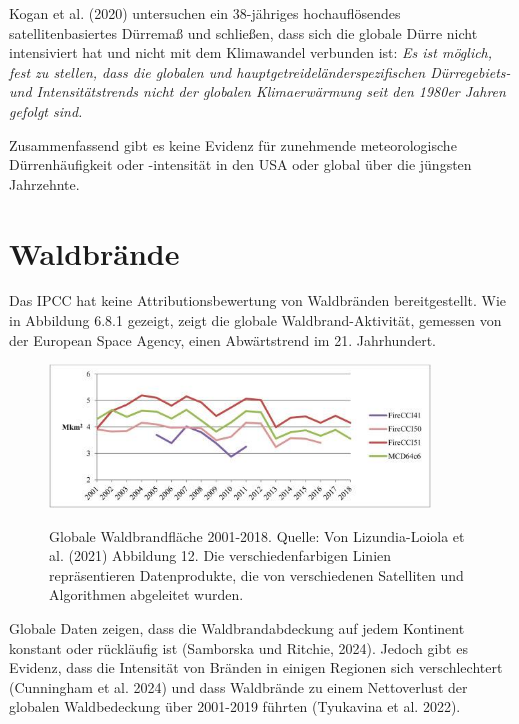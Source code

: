 \documentclass[12pt,paper=a4,DIV=12,parskip=never,chapterprefix=false,headings=standardclasses]{scrreprt}
\begin{document}
Kogan et al. (2020) untersuchen ein 38-jähriges hochauflösendes satellitenbasiertes Dürremaß und schließen, dass sich die globale Dürre nicht intensiviert hat und nicht mit dem Klimawandel verbunden ist: \emph{Es ist möglich, fest zu stellen, dass die globalen und hauptgetreideländerspezifischen Dürregebiets- und Intensitätstrends nicht der globalen Klimaerwärmung seit den 1980er Jahren gefolgt sind.}

Zusammenfassend gibt es keine Evidenz für zunehmende meteorologische Dürrenhäufigkeit oder -intensität in den USA oder global über die jüngsten Jahrzehnte.

\section{Waldbrände}
Das IPCC hat keine Attributionsbewertung von Waldbränden bereitgestellt. Wie in Abbildung 6.8.1 gezeigt, zeigt die globale Waldbrand-Aktivität, gemessen von der European Space Agency, einen Abwärtstrend im 21. Jahrhundert.

\begin{figure}[H]
\begin{center}
\includegraphics[width=0.9\textwidth]{bilder/bilderKlima-0063.jpg}\\[1cm]
\end{center}
\caption{Globale Waldbrandfläche 2001-2018. Quelle: Von Lizundia-Loiola et al. (2021) Abbildung 12. Die verschiedenfarbigen Linien repräsentieren Datenprodukte, die von verschiedenen Satelliten und Algorithmen abgeleitet wurden.}
\end{figure}

Globale Daten zeigen, dass die Waldbrandabdeckung auf jedem Kontinent konstant oder rückläufig ist (Samborska und Ritchie, 2024). Jedoch gibt es Evidenz, dass die Intensität von Bränden in einigen Regionen sich verschlechtert (Cunningham et al. 2024) und dass Waldbrände zu einem Nettoverlust der globalen Waldbedeckung über 2001-2019 führten (Tyukavina et al. 2022).
\end{document}
